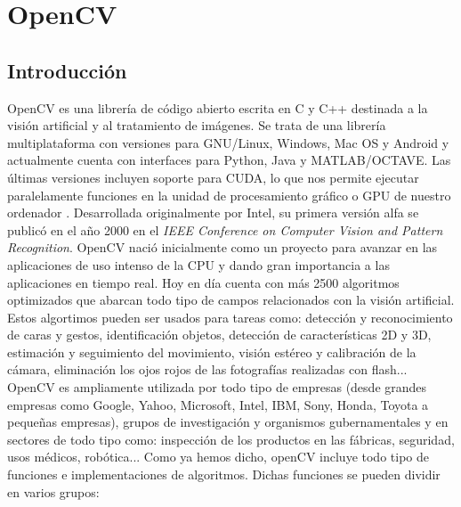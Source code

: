 \documentclass[a4paper,openright, 12pt]{book}
\begin{document}
\chapter{OpenCV}

\section{Introducción}
OpenCV es una librería de código abierto escrita en C y C++ destinada a la visión artificial y al tratamiento de imágenes. Se trata de una librería multiplataforma con versiones para GNU/Linux, Windows, Mac OS y Android y actualmente cuenta con interfaces para Python, Java y MATLAB/OCTAVE. Las últimas versiones incluyen soporte para CUDA, lo que nos permite ejecutar paralelamente funciones en la unidad de procesamiento gráfico o GPU de nuestro ordenador .
Desarrollada originalmente por Intel, su primera versión alfa se publicó en el año 2000 en el \textit{IEEE Conference on Computer Vision and Pattern Recognition}. OpenCV nació inicialmente como un proyecto para avanzar en las aplicaciones de uso intenso de la CPU y dando gran importancia a las aplicaciones en tiempo real. Hoy en día cuenta con más 2500 algoritmos optimizados que abarcan todo tipo de campos relacionados con la visión artificial.
Estos algortimos pueden ser usados para tareas como: detección y reconocimiento de caras y gestos, identificación objetos, detección de características 2D y 3D, estimación y seguimiento del movimiento, visión estéreo y calibración de la cámara, eliminación los ojos rojos de las fotografías realizadas con flash...
\newline
OpenCV es ampliamente utilizada por todo tipo de empresas (desde grandes empresas como Google, Yahoo, Microsoft, Intel, IBM, Sony, Honda, Toyota a pequeñas empresas), grupos de investigación y organismos gubernamentales y en sectores de todo tipo como: inspección de los productos en las fábricas, seguridad, usos médicos, robótica...
\newline
Como ya hemos dicho, openCV incluye todo tipo de funciones e implementaciones de algoritmos. 
Dichas funciones se pueden dividir en varios grupos:
\end{document}
